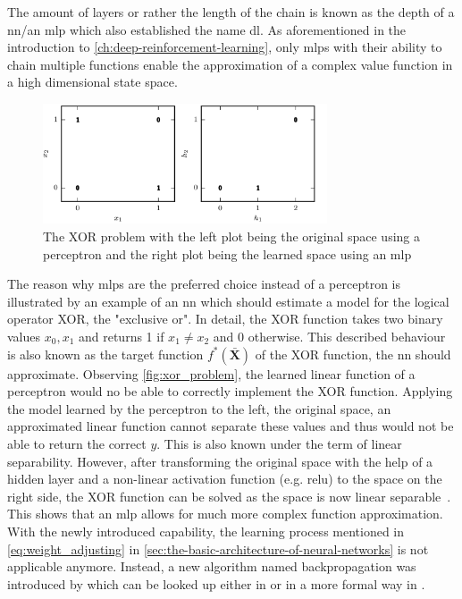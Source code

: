 \documentclass[draft,final]{vutinfth} %
\newcommand{\p}[1]{see p. #1}
\begin{document}
    The amount of layers or rather the length of the chain is known as the depth of a \gls{nn}/an \gls{mlp} which also established the name \acrlong{dl}.
    As aforementioned in the introduction to \autoref{ch:deep-reinforcement-learning}, only \glspl{mlp} with their ability to chain multiple functions enable the approximation of a complex value function in a high dimensional state space.

    \begin{figure}[h]
        \vspace{0.5cm}
        \centering
        \includegraphics[width=0.75\textwidth]{figures/xor_problem.png}
        \caption[The XOR problem]{The XOR problem with the left plot being the original space using a perceptron and the right plot being the learned space using an \gls{mlp}\protect\footnotemark}
        \label{fig:xor_problem}
    \end{figure}

    \footnotetext{\cite[\p{168}]{goodfellow_deep_2016}}
    The reason why \glspl{mlp} are the preferred choice instead of a perceptron is illustrated by an example of an \gls{nn} which should estimate a model for the logical operator XOR, the "exclusive or".
    In detail, the XOR function takes two binary values $x_0,x_1$ and returns 1 if $x_1 \neq x_2$ and 0 otherwise.
    This described behaviour is also known as the target function $f^*(\bar{\boldsymbol{X}})$ of the XOR function, the \gls{nn} should approximate.
    Observing \autoref{fig:xor_problem}, the learned linear function of a perceptron would no be able to correctly implement the XOR function.
    Applying the model learned by the perceptron to the left, the original space, an approximated linear function cannot separate these values and thus would not be able to return the correct $y$.
    This is also known under the term of linear separability.
    However, after transforming the original space with the help of a hidden layer and a non-linear activation function (e.g. \gls{relu}) to the space on the right side, the XOR function can be solved as the space is now linear separable~\citep[\p{166ff}; \p{32ff}]{goodfellow_deep_2016,aggarwal_neural_2018}.
    This shows that an \gls{mlp} allows for much more complex function approximation.
    With the newly introduced capability, the learning process mentioned in \autoref{eq:weight_adjusting} in \autoref{sec:the-basic-architecture-of-neural-networks} is not applicable anymore.
    Instead, a new algorithm named backpropagation was introduced by \citeauthor{rumelhart_learning_1986} which can be looked up either in \citet[\p{21}]{aggarwal_neural_2018} or in a more formal way in \citet[\p{197}]{goodfellow_deep_2016}.
\end{document}
